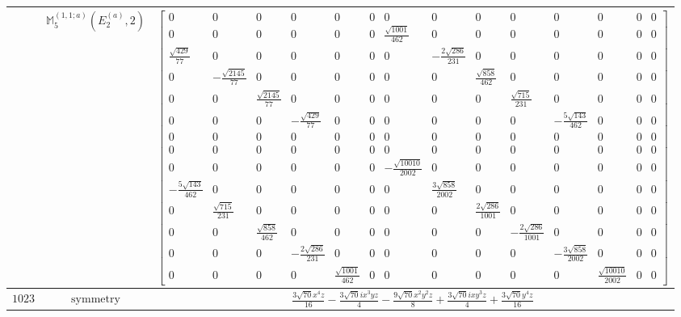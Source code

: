 \documentclass[fleqn,8pt,landscape]{jsarticle}
\begin{document}
\begin{longtable}{ccc}
$  $ & $ \mathbb{M}_{5}^{(1,1;a)}(E_{2}^{(a)},2) $ & $ \begin{bmatrix} 0 & 0 & 0 & 0 & 0 & 0 & 0 & 0 & 0 & 0 & 0 & 0 & 0 & 0 \\ 0 & 0 & 0 & 0 & 0 & 0 & \frac{\sqrt{1001}}{462} & 0 & 0 & 0 & 0 & 0 & 0 & 0 \\ \frac{\sqrt{429}}{77} & 0 & 0 & 0 & 0 & 0 & 0 & - \frac{2 \sqrt{286}}{231} & 0 & 0 & 0 & 0 & 0 & 0 \\ 0 & - \frac{\sqrt{2145}}{77} & 0 & 0 & 0 & 0 & 0 & 0 & \frac{\sqrt{858}}{462} & 0 & 0 & 0 & 0 & 0 \\ 0 & 0 & \frac{\sqrt{2145}}{77} & 0 & 0 & 0 & 0 & 0 & 0 & \frac{\sqrt{715}}{231} & 0 & 0 & 0 & 0 \\ 0 & 0 & 0 & - \frac{\sqrt{429}}{77} & 0 & 0 & 0 & 0 & 0 & 0 & - \frac{5 \sqrt{143}}{462} & 0 & 0 & 0 \\ 0 & 0 & 0 & 0 & 0 & 0 & 0 & 0 & 0 & 0 & 0 & 0 & 0 & 0 \\ 0 & 0 & 0 & 0 & 0 & 0 & 0 & 0 & 0 & 0 & 0 & 0 & 0 & 0 \\ 0 & 0 & 0 & 0 & 0 & 0 & - \frac{\sqrt{10010}}{2002} & 0 & 0 & 0 & 0 & 0 & 0 & 0 \\ - \frac{5 \sqrt{143}}{462} & 0 & 0 & 0 & 0 & 0 & 0 & \frac{3 \sqrt{858}}{2002} & 0 & 0 & 0 & 0 & 0 & 0 \\ 0 & \frac{\sqrt{715}}{231} & 0 & 0 & 0 & 0 & 0 & 0 & \frac{2 \sqrt{286}}{1001} & 0 & 0 & 0 & 0 & 0 \\ 0 & 0 & \frac{\sqrt{858}}{462} & 0 & 0 & 0 & 0 & 0 & 0 & - \frac{2 \sqrt{286}}{1001} & 0 & 0 & 0 & 0 \\ 0 & 0 & 0 & - \frac{2 \sqrt{286}}{231} & 0 & 0 & 0 & 0 & 0 & 0 & - \frac{3 \sqrt{858}}{2002} & 0 & 0 & 0 \\ 0 & 0 & 0 & 0 & \frac{\sqrt{1001}}{462} & 0 & 0 & 0 & 0 & 0 & 0 & \frac{\sqrt{10010}}{2002} & 0 & 0 \end{bmatrix} $ \\ \hline
$ 1023 $ & $ \text{symmetry} $ & $ \frac{3 \sqrt{70} x^{4} z}{16} - \frac{3 \sqrt{70} i x^{3} y z}{4} - \frac{9 \sqrt{70} x^{2} y^{2} z}{8} + \frac{3 \sqrt{70} i x y^{3} z}{4} + \frac{3 \sqrt{70} y^{4} z}{16} $ \\

\end{longtable}
\end{document}
